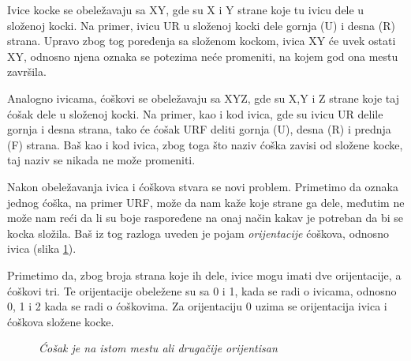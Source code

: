 \documentclass[a4paper]{article}
\begin{document}
Ivice kocke se obeležavaju sa XY, gde su X i Y strane koje tu ivicu dele u složenoj kocki. Na primer, ivicu UR u složenoj kocki dele gornja (U) i desna (R) strana. Upravo zbog tog poređenja sa složenom kockom, ivica XY će uvek ostati XY, odnosno njena oznaka se potezima neće promeniti, na kojem god ona mestu završila.

Analogno ivicama, ćoškovi se obeležavaju sa XYZ, gde su X,Y i Z strane koje taj ćošak dele u složenoj kocki. Na primer, kao i kod ivica, gde su ivicu UR delile gornja i desna strana, tako će ćošak URF deliti gornja (U), desna (R) i prednja (F) strana. Baš kao i kod ivica, zbog toga što naziv ćoška zavisi od složene kocke, taj naziv se nikada ne može promeniti.

Nakon obeležavanja ivica i ćoškova stvara se novi problem. Primetimo da oznaka jednog ćoška, na primer URF, može da nam kaže koje strane ga dele, međutim ne može nam reći da li su boje raspoređene na onaj način kakav je potreban da bi se kocka složila. Baš iz tog razloga uveden je pojam \emph{orijentacije} ćoškova, odnosno ivica (slika \ref{fig:cosak-orijentacija-primer}).

Primetimo da, zbog broja strana koje ih dele, ivice mogu imati dve orijentacije, a ćoškovi tri. Te orijentacije obeležene su sa 0 i 1, kada se radi o ivicama, odnosno 0, 1 i 2 kada se radi o ćoškovima. Za orijentaciju 0 uzima se orijentacija ivica i ćoškova složene kocke. 

\begin{figure}[h]
        \centering
        \caption{\emph{Ćošak je na istom mestu ali drugačije orijentisan}}
        \label{fig:cosak-orijentacija-primer}
    \end{figure}
\end{document}
